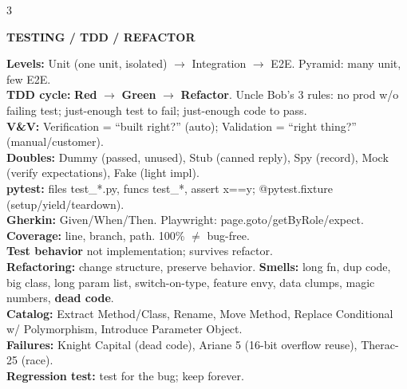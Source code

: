 \documentclass[10pt,letterpaper]{article}
\newenvironment{topic}[1]{%
  \par\addvspace{1.5pt}%
  \noindent\colorbox{hdrBG}{%
    \begin{minipage}{\dimexpr\linewidth-2\fboxsep\relax}%
      \centering\bfseries\sffamily\fontsize{6pt}{7pt}\selectfont\color{hdrFG}\MakeUppercase{#1}%
    \end{minipage}%
  }\par\nobreak\vskip0.5pt%
  \begingroup\setlength{\leftskip}{0pt}\setlength{\rightskip}{0pt}%
}{%
  \endgroup\par\addvspace{0.5pt}%
}
\newcommand{\warn}[1]{\textcolor{warnC}{\textbf{#1}}}
\newcommand{\ok}[1]{\textcolor{okC}{\textbf{#1}}}
\newcommand{\hd}[1]{\textcolor{accent}{\textbf{#1}}}
\newcommand{\cn}[1]{{\ttfamily\small #1}}
\begin{document}
\begin{multicols*}{3}
\begin{topic}{Testing / TDD / Refactor}
\hd{Levels:} Unit (one unit, isolated) $\to$ Integration $\to$ E2E. Pyramid: many unit, few E2E.\\
\hd{TDD cycle:} \warn{Red} $\to$ \ok{Green} $\to$ \textbf{Refactor}. Uncle Bob's 3 rules: no prod w/o failing test; just-enough test to fail; just-enough code to pass.\\
\hd{V\&V:} Verification = ``built right?'' (auto); Validation = ``right thing?'' (manual/customer).\\
\hd{Doubles:} Dummy (passed, unused), Stub (canned reply), Spy (record), Mock (verify expectations), Fake (light impl).\\
\hd{pytest:} files \cn{test\_*.py}, funcs \cn{test\_*}, \cn{assert x==y}; \cn{@pytest.fixture} (setup/yield/teardown).\\
\hd{Gherkin:} Given/When/Then. Playwright: \cn{page.goto/getByRole/expect}.\\
\hd{Coverage:} line, branch, path. 100\% $\neq$ bug-free.\\
\hd{Test behavior} not implementation; survives refactor.\\
\hd{Refactoring:} change structure, preserve behavior. \hd{Smells:} long fn, dup code, big class, long param list, switch-on-type, feature envy, data clumps, magic numbers, \warn{dead code}.\\
\hd{Catalog:} Extract Method/Class, Rename, Move Method, Replace Conditional w/ Polymorphism, Introduce Parameter Object.\\
\warn{Failures:} Knight Capital (dead code), Ariane 5 (16-bit overflow reuse), Therac-25 (race).\\
\hd{Regression test:} test for the bug; keep forever.
\end{topic}


\end{multicols*}
\end{document}
